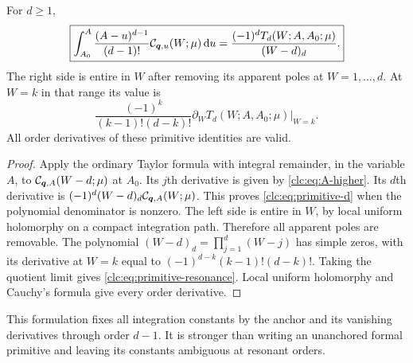 \begin{theorem}
\label{clc:thm:primitives}
For $d\ge1$,
\begin{equation}\label{clc:eq:primitive-d}
 \boxed{\displaystyle
 \int_{A_0}^A\frac{(A-u)^{d-1}}{(d-1)!}
                 \mathcal C_{\boldsymbol q,u}(W;\mu)\,\mathrm d u
 =\frac{(-1)^dT_d(W;A,A_0;\mu)}{(W-d)_d}.}
\end{equation}
The right side is entire in $W$ after removing its apparent poles at
$W=1,\ldots,d$. At $W=k$ in that range its value is
\begin{equation}\label{clc:eq:primitive-resonance}
 \frac{(-1)^k}{(k-1)!(d-k)!}
            \left.\partial_WT_d(W;A,A_0;\mu)\right|_{W=k}.
\end{equation}
All order derivatives of these primitive identities are valid.
\end{theorem}
\begin{proof}
Apply the ordinary Taylor formula with integral remainder, in the
variable $A$, to $\mathcal C_{\boldsymbol q,A}(W-d;\mu)$ at $A_0$. Its $j$th derivative
is given by \eqref{clc:eq:A-higher}. Its $d$th derivative is
$(-1)^d(W-d)_d\mathcal C_{\boldsymbol q,A}(W;\mu)$. This proves
\eqref{clc:eq:primitive-d} when the polynomial denominator is nonzero.
The left side is entire in $W$, by local uniform holomorphy on a compact
integration path. Therefore all apparent poles are removable.
The polynomial $(W-d)_d=\prod_{j=1}^d(W-j)$ has simple zeros, with
its derivative at $W=k$ equal to
$(-1)^{d-k}(k-1)!(d-k)!$.
Taking the quotient limit gives \eqref{clc:eq:primitive-resonance}.
Local uniform holomorphy and Cauchy's formula give every order derivative.
\end{proof}

This formulation fixes all integration constants by the anchor and
its vanishing derivatives through order $d-1$. It is stronger than
writing an unanchored formal primitive and leaving its constants
ambiguous at resonant orders.

